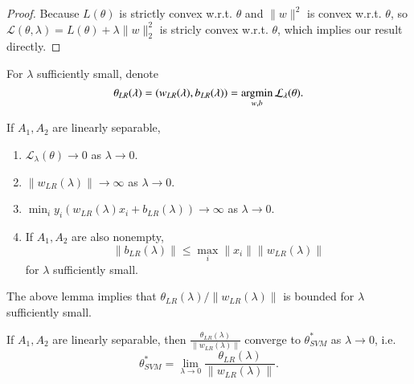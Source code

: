 \begin{proof}
Because $L(\theta)$ is strictly convex w.r.t. $\theta$ and $\|w\|^2$ is convex w.r.t. $\theta$, so $\mathcal L(\theta,\lambda)  = L(\theta) + \lambda \|w\|_2^2$ is stricly convex w.r.t. $\theta$, which implies our result directly.

\end{proof}

For $\lambda$ sufficiently small, denote
\begin{equation}
	\theta_{LR}(\lambda) = (w_{LR}(\lambda),b_{LR}(\lambda)) = \mathop{\rm argmin}_{w,b} \mathcal L_{\lambda}(\theta).
\end{equation}

\begin{lemma}
	If $A_1,A_2$ are linearly separable,  
	\begin{enumerate}
	\item $\mathcal L_{\lambda}(\theta) \rightarrow 0$ as $\lambda \rightarrow 0$.
	\item $\|w_{LR}(\lambda)\|\rightarrow \infty$ as $\lambda \rightarrow 0$.
	\item $\displaystyle \min_{i} y_i(w_{LR}(\lambda) x_i + b_{LR}(\lambda))\rightarrow \infty$ as $\lambda \rightarrow 0$.
	\item If $A_1,A_2$ are also nonempty, 
	\begin{equation}
		\|b_{LR}(\lambda)\|\leq \max_{i} \|x_i\| \|w_{LR}(\lambda)\|
	\end{equation}
	for $\lambda$ sufficiently small.
	\end{enumerate}
\end{lemma}

The above lemma implies that $\theta_{LR}(\lambda)/\|w_{LR}(\lambda)\|$ is bounded for $\lambda$ sufficiently small.

\begin{theorem}
	If $A_1,A_2$ are linearly separable, then $\frac{\theta_{LR}(\lambda)}{\|w_{LR}(\lambda)\|}$ converge to $\theta^*_{SVM}$ as $\lambda \rightarrow 0$, i.e.
	\begin{equation}
		\theta^*_{SVM} = \lim_{\lambda\rightarrow 0} \frac{\theta_{LR}(\lambda)}{\|w_{LR}(\lambda)\|}.
	\end{equation}
\end{theorem}

